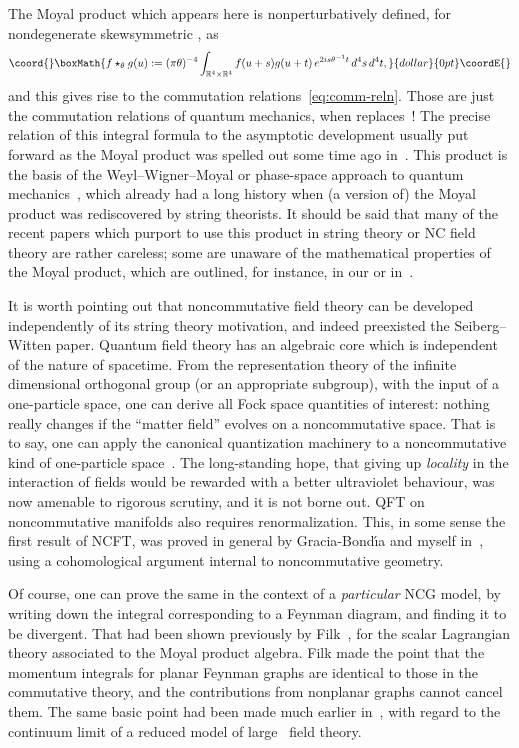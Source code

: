 \documentclass[a4paper,12pt]{article}
\providecommand{\R}{\mathbb{R}}         %
\providecommand{\x}{\times}             %
\providecommand{\1}{\mathbf{1}}         %
\providecommand{\7}{\dagger}            %
\providecommand{\8}{\bullet}            %
\renewcommand{\.}{\cdot}            %
\renewcommand{\:}{\colon}           %
\begin{document}
The Moyal product which appears here is nonperturbatively defined, for
nondegenerate skewsymmetric \myHighlight{$\theta$}\coordHE{}, as
$$\coord{}\boxMath{
f \star_\theta g(u) := (\pi\theta)^{-4}
\int_{\R^4\x\R^4} f(u + s)g(u + t)\,e^{2is\theta^{-1}t}\,d^4s\,d^4t,
}{dollar}{0pt}\coordE{}$$
and this gives rise to the commutation relations~\eqref{eq:comm-reln}.
Those are just the commutation relations of quantum mechanics, when
\myHighlight{$\hbar$}\coordHE{} replaces~\myHighlight{$\theta$}\coordHE{}! The precise relation of this integral
formula to the asymptotic development usually put forward as the
Moyal product was spelled out some time ago in~\cite{Nereid}. This
product is the basis of the Weyl--Wigner--Moyal or phase-space
approach to quantum mechanics~\cite{Moyal}, which already had a long
history when (a version of) the Moyal product was rediscovered by
string theorists. It should be said that many of the recent papers
which purport to use this product in string theory or NC field theory
are rather careless; some are unaware of the mathematical properties
of the Moyal product, which are outlined, for instance, in our
\cite{Phobos,Deimos} or in~\cite{Selene}.

It is worth pointing out that noncommutative field theory can be
developed independently of its string theory motivation, and indeed
preexisted the Seiberg--Witten paper. Quantum field theory has an
algebraic core which is independent of the nature of spacetime. From
the representation theory of the infinite dimensional orthogonal group
(or an appropriate subgroup), with the input of a one-particle space,
one can derive all Fock space quantities of interest: nothing really
changes if the ``matter field'' evolves on a noncommutative space.
That is to say, one can apply the canonical quantization machinery to
a noncommutative kind of one-particle space~\cite{Atlas}. The
long-standing hope, that giving up \textit{locality} in the
interaction of fields would be rewarded with a better ultraviolet
behaviour, was now amenable to rigorous scrutiny, and it is not borne
out. QFT on noncommutative manifolds also requires renormalization.
This, in some sense the first result of NCFT, was proved in general by
Gracia-Bond\'{\i}a and myself in~\cite{Atlas}, using a cohomological 
argument internal to noncommutative geometry.

Of course, one can prove the same in the context of a
\textit{particular} NCG model, by writing down the integral
corresponding to a Feynman diagram, and finding it to be divergent.
That had been shown previously by Filk~\cite{Filk}, for the scalar
Lagrangian theory associated to the Moyal product algebra. Filk made
the point that the momentum integrals for planar Feynman graphs are
identical to those in the commutative theory, and the contributions
from nonplanar graphs cannot cancel them. The same basic point had
been made much earlier in~\cite{GonzalezAKA}, with regard to the
continuum limit of a reduced model of large~\coordHE{} field theory.
\end{document}
